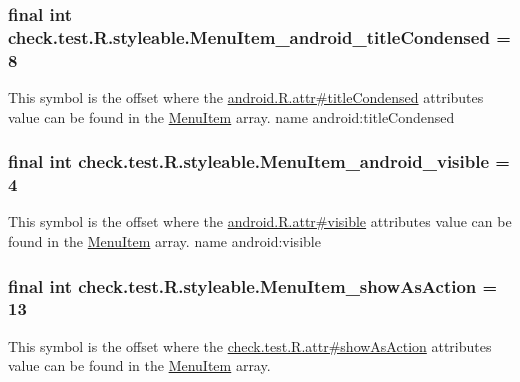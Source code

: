 \subsubsection[{Menu\+Item\+\_\+android\+\_\+title\+Condensed}]{\setlength{\rightskip}{0pt plus 5cm}final int check.\+test.\+R.\+styleable.\+Menu\+Item\+\_\+android\+\_\+title\+Condensed = 8\hspace{0.3cm}{\ttfamily [static]}}\label{classcheck_1_1test_1_1_r_1_1styleable_a789a23064482ca589c0b3d8f0a0adaae}
This symbol is the offset where the \hyperlink{}{android.\+R.\+attr\#title\+Condensed} attribute\textquotesingle{}s value can be found in the \hyperlink{classcheck_1_1test_1_1_r_1_1styleable_af26376072eab01d1b4197e48992dc936}{Menu\+Item} array.  name android\+:title\+Condensed \hypertarget{classcheck_1_1test_1_1_r_1_1styleable_a1c79d64eac1e675e15e462194f67b098}{}
\subsubsection[{Menu\+Item\+\_\+android\+\_\+visible}]{\setlength{\rightskip}{0pt plus 5cm}final int check.\+test.\+R.\+styleable.\+Menu\+Item\+\_\+android\+\_\+visible = 4\hspace{0.3cm}{\ttfamily [static]}}\label{classcheck_1_1test_1_1_r_1_1styleable_a1c79d64eac1e675e15e462194f67b098}
This symbol is the offset where the \hyperlink{}{android.\+R.\+attr\#visible} attribute\textquotesingle{}s value can be found in the \hyperlink{classcheck_1_1test_1_1_r_1_1styleable_af26376072eab01d1b4197e48992dc936}{Menu\+Item} array.  name android\+:visible \hypertarget{classcheck_1_1test_1_1_r_1_1styleable_aa76aaf06f02ab88d86f636df6aa194a3}{}
\subsubsection[{Menu\+Item\+\_\+show\+As\+Action}]{\setlength{\rightskip}{0pt plus 5cm}final int check.\+test.\+R.\+styleable.\+Menu\+Item\+\_\+show\+As\+Action = 13\hspace{0.3cm}{\ttfamily [static]}}\label{classcheck_1_1test_1_1_r_1_1styleable_aa76aaf06f02ab88d86f636df6aa194a3}
This symbol is the offset where the \hyperlink{classcheck_1_1test_1_1_r_1_1attr_a696ac4659352897d9af0044b2b9ecd16}{check.\+test.\+R.\+attr\#show\+As\+Action} attribute\textquotesingle{}s value can be found in the \hyperlink{classcheck_1_1test_1_1_r_1_1styleable_af26376072eab01d1b4197e48992dc936}{Menu\+Item} array.

